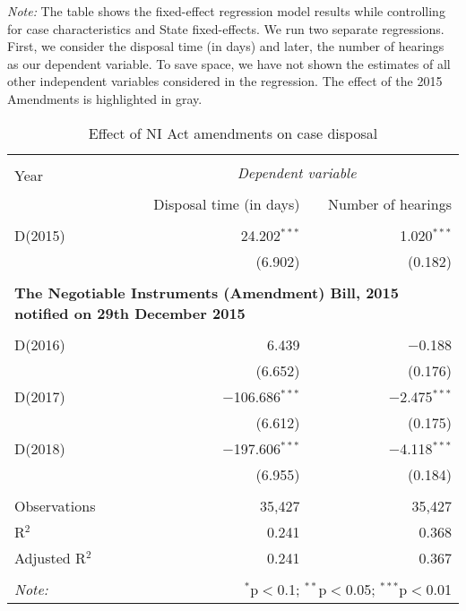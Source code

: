 \documentclass[12pt,a4paper]{article}
\begin{document}
\begin{table}[ht]
\centering
\caption{Effect of NI Act amendments on case
disposal}\label{tab:amendments_effect}
\footnotesize
\textit{Note:} The table shows the fixed-effect regression model results while controlling for case characteristics and State fixed-effects. We run two separate regressions. First, we consider the disposal time (in days) and later, the number of hearings as our dependent variable. To save space, we have not shown the estimates of all other independent variables considered in the regression. The effect of the 2015 Amendments is highlighted in gray.

\begin{tabular}{@{\extracolsep{5pt}}lrr}
\\[-1.8ex]
\hline \\[-1.8ex]
\multirow{2}{*}{Year} & \multicolumn{2}{c}{\textit{Dependent variable}} \\
\cline{2-3}
\\[-1.8ex] & Disposal time (in days) & Number of hearings \\
\hline \\[-1.8ex]
D(2015) & 24.202$^{***}$ & 1.020$^{***}$ \\
& (6.902) & (0.182) \\
& & \\
\multicolumn{3}{l}{\textbf{The Negotiable Instruments (Amendment) Bill, 2015 notified on 29th December 2015}}\\
& & \\
D(2016) & 6.439 & $-$0.188 \\
& (6.652) & (0.176) \\
\rowcolor{lightgray}
D(2017) & $-$106.686$^{***}$ & $-$2.475$^{***}$ \\
& (6.612) & (0.175) \\
\rowcolor{lightgray}
D(2018) & $-$197.606$^{***}$ & $-$4.118$^{***}$ \\
& (6.955) & (0.184) \\
\hline \\[-1.8ex]
Observations & 35,427 & 35,427 \\
R$^{2}$ & 0.241 & 0.368 \\
Adjusted R$^{2}$ & 0.241 & 0.367 \\
\hline \\[-1.8ex]
\textit{Note:} & \multicolumn{2}{r}{$^{*}$p$<$0.1; $^{**}$p$<$0.05; $^{***}$p$<$0.01} \\
\end{tabular}
\end{table}
\end{document}
